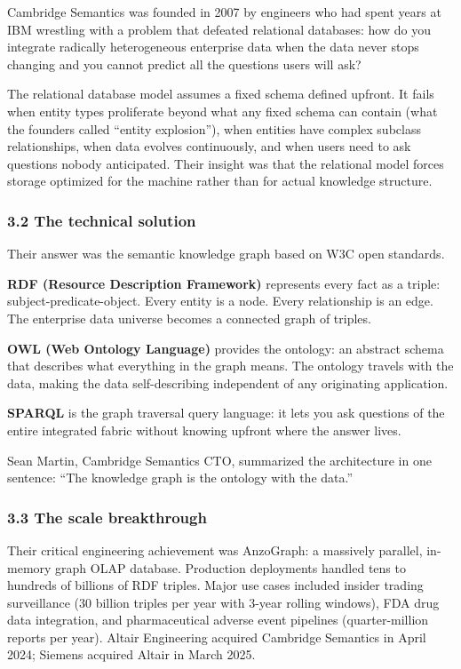 \documentclass[
  11pt,
  letterpaper,
]{article}
\begin{document}
Cambridge Semantics was founded in 2007 by engineers who had spent years
at IBM wrestling with a problem that defeated relational databases: how
do you integrate radically heterogeneous enterprise data when the data
never stops changing and you cannot predict all the questions users will
ask?

The relational database model assumes a fixed schema defined upfront. It
fails when entity types proliferate beyond what any fixed schema can
contain (what the founders called ``entity explosion''), when entities
have complex subclass relationships, when data evolves continuously, and
when users need to ask questions nobody anticipated. Their insight was
that the relational model forces storage optimized for the machine
rather than for actual knowledge structure.

\subsubsection{3.2 The technical solution}\label{the-technical-solution}

Their answer was the semantic knowledge graph based on W3C open
standards.

\textbf{RDF (Resource Description Framework)} represents every fact as a
triple: subject-predicate-object. Every entity is a node. Every
relationship is an edge. The enterprise data universe becomes a
connected graph of triples.

\textbf{OWL (Web Ontology Language)} provides the ontology: an abstract
schema that describes what everything in the graph means. The ontology
travels with the data, making the data self-describing independent of
any originating application.

\textbf{SPARQL} is the graph traversal query language: it lets you ask
questions of the entire integrated fabric without knowing upfront where
the answer lives.

Sean Martin, Cambridge Semantics CTO, summarized the architecture in one
sentence: ``The knowledge graph is the ontology with the data.''

\subsubsection{3.3 The scale breakthrough}\label{the-scale-breakthrough}

Their critical engineering achievement was AnzoGraph: a massively
parallel, in-memory graph OLAP database. Production deployments handled
tens to hundreds of billions of RDF triples. Major use cases included
insider trading surveillance (30 billion triples per year with 3-year
rolling windows), FDA drug data integration, and pharmaceutical adverse
event pipelines (quarter-million reports per year). Altair Engineering
acquired Cambridge Semantics in April 2024; Siemens acquired Altair in
March 2025.
\end{document}
